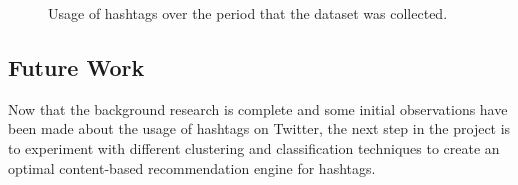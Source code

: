 \documentclass[12pt,a4paper]{article}
\begin{document}
\begin{figure}[H]
    \centering

    \caption{Usage of hashtags over the period that the dataset was collected.}
\end{figure}

\subsection{Future Work}
Now that the background research is complete and some initial observations have been made about the usage of hashtags on Twitter, the next step in the project is to experiment with different clustering and classification techniques to create an optimal content-based recommendation engine for hashtags.
\end{document}
